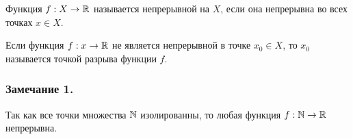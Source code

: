 \opred

Функция $f:X\to \mathbb{R}$ называется непрерывной на $X$, если она непрерывна во всех точках $x \in X$.

\opred

Если функция $f:x \to \mathbb{R}$ не является непрерывной в точке $x_0 \in X$, то $x_0$ называется точкой разрыва функции $f$.

\subsubsection{Замечание 1.}

Так как все точки множества $\mathbb{N}$ изолированны, то любая функция $f:\mathbb{N} \to \mathbb{R}$ непрерывна.
